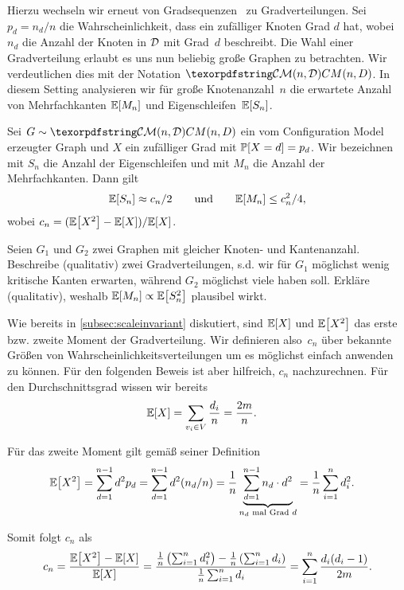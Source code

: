 Hierzu wechseln wir erneut von Gradsequenzen~\degseq{} zu Gradverteilungen.
Sei $p_d = n_d / n$ die Wahrscheinlichkeit, dass ein zufälliger Knoten Grad $d$ hat, wobei $n_d$ die Anzahl der Knoten in $\mathcal{D}$ mit Grad~$d$ beschreibt.
Die Wahl einer Gradverteilung erlaubt es uns nun beliebig große Graphen zu betrachten.
Wir verdeutlichen dies mit der Notation $\CMnd$.
In diesem Setting analysieren wir für große Knotenanzahl~$n$ die erwartete Anzahl von Mehrfachkanten $\mathbb{E}\!\left[M_n\right]$ und Eigenschleifen~$\mathbb{E}\!\left[S_n\right]$.

\begin{lemma}\label{lem:cm_anzahl_nicht_einfach}
    Sei $G \follows \CMnd$ ein vom Configuration Model erzeugter Graph und $X$ ein zufälliger Grad mit $\mathbb{P}\!\left[X = d\right] = p_d$.
    Wir bezeichnen mit $S_n$ die Anzahl der Eigenschleifen und mit $M_n$ die Anzahl der Mehrfachkanten.
    Dann gilt
    \begin{align}
        \mathbb{E}\!\left[S_n\right] \approx c_n/2 \qquad \text{und} \qquad \mathbb{E}\!\left[M_n\right] \le c_n^2 / 4,
    \end{align}
    wobei $c_n = (\mathbb{E}\!\left[X^2\right] - \mathbb{E}\!\left[X\right]) / \mathbb{E}\!\left[X\right]$.
\end{lemma}

\begin{exercise}
    Seien $G_1$ und $G_2$ zwei Graphen mit gleicher Knoten- und Kantenanzahl.
    Beschreibe (qualitativ) zwei Gradverteilungen, s.d. wir für $G_1$ möglichst wenig kritische Kanten erwarten, während $G_2$ möglichst viele haben soll.
    Erkläre (qualitativ), weshalb $\mathbb{E}\!\left[M_n\right] \propto \mathbb{E}\!\left[S_n^2\right]$ plausibel wirkt.
\end{exercise}

\begin{remark}
    Wie bereits in \cref{subsec:scaleinvariant} diskutiert, sind $\mathbb{E}\!\left[X\right]$ und $\mathbb{E}\!\left[X^2\right]$ das erste bzw. zweite Moment der Gradverteilung.
    Wir definieren also~$c_n$ über bekannte Größen von Wahrscheinlichkeitsverteilungen um es möglichst einfach anwenden zu können.
    Für den folgenden Beweis ist aber hilfreich, $c_n$ nachzurechnen.
    Für den Durchschnittsgrad wissen wir bereits
    \begin{align}
        \mathbb{E}\!\left[X\right] & = \sum_{v_i \in V} \frac{d_i}{n} = \frac {2m}{n}.
    \end{align}

    \noindent
    Für das zweite Moment gilt gemäß seiner Definition
    \begin{align}
        \mathbb{E}\!\left[X^2\right]
         & = \sum_{d=1}^{n-1} d^2 p_d
        = \sum_{d=1}^{n-1} d^2 (n_d / n)
        = \frac 1 n \underbrace{\sum_{d=1}^{n-1} n_d \cdot d^2}_\text{$n_d$ mal Grad $d$}
        = \frac 1 n \sum_{i=1}^n d_i^2.
    \end{align}

    \noindent
    Somit folgt $c_n$ als
    \begin{align}
        c_n
        = \frac{\mathbb{E}\!\left[X^2\right] - \mathbb{E}\!\left[X\right]}{\mathbb{E}\!\left[X\right]}
        = \frac{ \frac 1 n \left(\sum_{i=1}^n d_i^2\right) - \frac 1 n \left(\sum_{i=1}^n d_i\right)}{\frac 1 n \sum_{i=1}^n d_i}
        = \sum_{i=1}^n \frac{d_i (d_i - 1)}{2m}.
    \end{align}
\end{remark}

